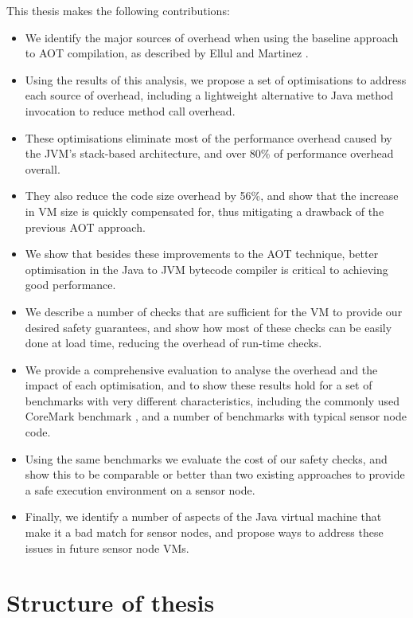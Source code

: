 This thesis makes the following contributions:
\begin{itemize}
	\item We identify the major sources of overhead when using the baseline approach to AOT compilation, as described by Ellul and Martinez \cite{Ellul:2010iw, Ellul:2012thesis}.
	\item Using the results of this analysis, we propose a set of optimisations to address each source of overhead, including a lightweight alternative to Java method invocation to reduce method call overhead.
	\item These optimisations eliminate most of the performance overhead caused by the JVM's stack-based architecture, and over 80\% of performance overhead overall.
	\item They also reduce the code size overhead by 56\%, and show that the increase in VM size is quickly compensated for, thus mitigating a drawback of the previous AOT approach.
	\item We show that besides these improvements to the AOT technique, better optimisation in the Java to JVM bytecode compiler is critical to achieving good performance.
	\item We describe a number of checks that are sufficient for the VM to provide our desired safety guarantees, and show how most of these checks can be easily done at load time, reducing the overhead of run-time checks.
	\item We provide a comprehensive evaluation to analyse the overhead and the impact of each optimisation, and to show these results hold for a set of benchmarks with very different characteristics, including the commonly used CoreMark benchmark \cite{coremark}, and a number of benchmarks with typical sensor node code.
	\item Using the same benchmarks we evaluate the cost of our safety checks, and show this to be comparable or better than two existing approaches to provide a safe execution environment on a sensor node.
	\item Finally, we identify a number of aspects of the Java virtual machine that make it a bad match for sensor nodes, and propose ways to address these issues in future sensor node VMs.
\end{itemize}

\section{Structure of thesis}

